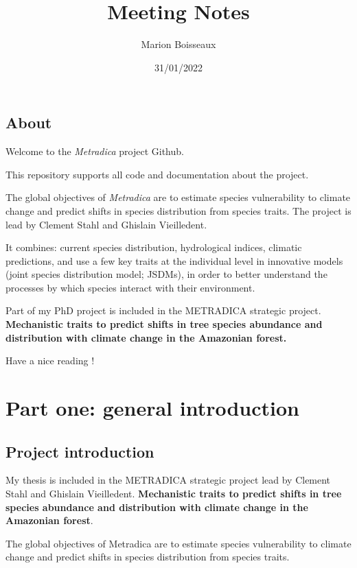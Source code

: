 \documentclass[
]{book}
\title{Meeting Notes}
\author{Marion Boisseaux}
\date{31/01/2022}
\begin{document}
\maketitle

{
\setcounter{tocdepth}{1}
\tableofcontents
}
\hypertarget{about}{%
\chapter{About}\label{about}}

Welcome to the \emph{Metradica} project Github.

This repository supports all code and documentation about the project.

The global objectives of \emph{Metradica} are to estimate species vulnerability to climate change and predict shifts in species distribution from species traits. The project is lead by Clement Stahl and Ghislain Vieilledent.

It combines: current species distribution, hydrological indices, climatic predictions, and use a few key traits at the individual level in innovative models (joint species distribution model; JSDMs), in order to better understand the processes by which species interact with their environment.

Part of my PhD project is included in the METRADICA strategic project. \textbf{Mechanistic traits to predict shifts in tree species abundance and distribution with climate change in the Amazonian forest.}

Have a nice reading !

\hypertarget{part-part-one-general-introduction}{%
\part{Part one: general introduction}\label{part-part-one-general-introduction}}

\hypertarget{project-introduction}{%
\chapter{Project introduction}\label{project-introduction}}

My thesis is included in the METRADICA strategic project lead by Clement Stahl and Ghislain Vieilledent. \textbf{Mechanistic traits to predict shifts in tree species abundance and distribution with climate change in the Amazonian forest}.

The global objectives of Metradica are to estimate species vulnerability to climate change and predict shifts in species distribution from species traits.
\end{document}
